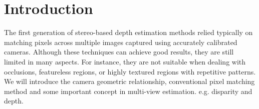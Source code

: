 
\section{Introduction}
\label{ch:Introduction}

The first generation of stereo-based depth estimation methods relied typically on matching pixels across multiple images captured using accurately calibrated cameras. Although these techniques can achieve good results, they are still limited in many aspects. For instance, they are not suitable when dealing with occlusions, featureless regions, or highly textured regions with repetitive patterns. We will introduce the camera geometric relationship, conventional pixel matching method and some important concept in multi-view estimation. e.g. disparity and depth. 

